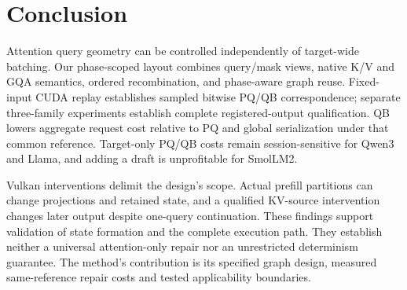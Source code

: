 \section{Conclusion}
\label{sec:conclusion}
Attention query geometry can be controlled independently of target-wide batching. Our phase-scoped layout combines query/mask views, native K/V and GQA semantics, ordered recombination, and phase-aware graph reuse. Fixed-input CUDA replay establishes sampled bitwise PQ/QB correspondence; separate three-family experiments establish complete registered-output qualification. QB lowers aggregate request cost relative to PQ and global serialization under that common reference. Target-only PQ/QB costs remain session-sensitive for Qwen3 and Llama, and adding a draft is unprofitable for SmolLM2.

Vulkan interventions delimit the design's scope. Actual prefill partitions can change projections and retained state, and a qualified KV-source intervention changes later output despite one-query continuation. These findings support validation of state formation and the complete execution path. They establish neither a universal attention-only repair nor an unrestricted determinism guarantee. The method's contribution is its specified graph design, measured same-reference repair costs and tested applicability boundaries.
